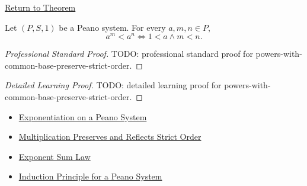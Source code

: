\newpage
{}
\label{prf:powers-with-common-base-preserve-strict-order}

\begin{remark*}[Return]
\hyperref[thm:powers-with-common-base-preserve-strict-order]{Return to Theorem}
\end{remark*}

\begin{theorem*}
Let $(P,S,1)$ be a Peano system. For every $a,m,n \in P$,
\[
a^m<a^n
\Longleftrightarrow
1<a \land m<n.
\]
\end{theorem*}

\begin{proof}[Professional Standard Proof]
\LRAProofBodyStart
TODO: professional standard proof for powers-with-common-base-preserve-strict-order.
\end{proof}

\begin{proof}[Detailed Learning Proof]
\LRAProofBodyStart
TODO: detailed learning proof for powers-with-common-base-preserve-strict-order.
\end{proof}

\begin{remark*}
\end{remark*}

\begin{dependencies}
\begin{itemize}
  \item \hyperref[def:exponentiation-on-peano-system]{Exponentiation on a Peano System}
  \item \hyperref[thm:multiplication-preserves-and-reflects-strict-order]{Multiplication Preserves and Reflects Strict Order}
  \item \hyperref[thm:exponent-sum-law]{Exponent Sum Law}
  \item \hyperref[thm:induction-principle-for-peano-system]{Induction Principle for a Peano System}
\end{itemize}
\end{dependencies}

\clearpage
